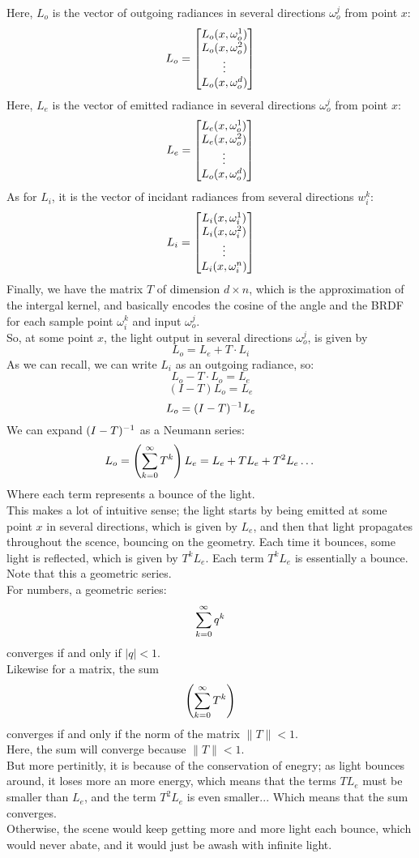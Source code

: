 \documentclass[12pt]{article}
\begin{document}
Here, $L_o$ is the vector of outgoing radiances 
in several directions $\omega_o^j$ from point $x$:
\[ L_o = \begin{bmatrix} L_o(x, \omega_o^1) \\ L_o(x, \omega_o^2) \\
\vdots \\ L_o(x, \omega_o^d) \end{bmatrix} \]
Here, $L_e$ is the vector of emitted radiance 
in several directions $\omega_o^j$ from point $x$:
\[ L_e = \begin{bmatrix} L_e(x, \omega_o^1) \\ L_e(x, \omega_o^2) \\
\vdots \\ L_o(x, \omega_o^d) \end{bmatrix} \]
As for $L_i$, it is the vector of incidant radiances
from several directions $w_i^k$:
\[ L_i = \begin{bmatrix} L_i(x, \omega_i^1) \\ L_i(x, \omega_i^2) \\
\vdots \\ L_i(x, \omega_i^n) \end{bmatrix} \]
Finally, we have the matrix $T$ 
of dimension $d \times n$, which is the approximation
of the intergal kernel,
and basically encodes the cosine of the angle
and the BRDF for each sample point $\omega_i^k$
and input $\omega_o^j$. \\

So, at some point $x$, the light output
in several directions $\omega_o^j$,
is given by 
\[ L_o = L_e + T \cdot L_i \]
As we can recall, we can write $L_i$
as an outgoing radiance, so:
\[ L_o - T \cdot L_o = L_e \]
\[ (I - T)L_o = L_e \]
\[ L_o = (I - T)^{-1} L_e \]
We can expand $(I - T)^{-1}$ as a Neumann series:
\[ L_o = \left( \sum_{k = 0}^{\infty} T^k \right) L_e
= L_e + TL_e + T^2L_e \dots \]
Where each term represents a bounce of the light. \\

This makes a lot of intuitive sense;
the light starts by being emitted at some point
$x$ in several directions, which is given by $L_e$,
and then that light propagates throughout the scence,
bouncing on the geometry. Each time it bounces,
some light is reflected, which is given by $T^k L_e$.
Each term $T^k L_e$ is essentially a bounce. \\
Note that this a geometric series. \\

For numbers, a geometric series:
\[ \sum_{k = 0}^{\infty} q^k \]
converges if and only if $|q| < 1$. \\

Likewise for a matrix, the sum
\[ \left( \sum_{k = 0}^{\infty} T^k \right) \]
converges if and only if the norm of the matrix
$\|T\| < 1$. \\

Here, the sum will converge because $\|T\| < 1$. \\
But more pertinitly, it is because of the conservation
of enegry; as light bounces around,
it loses more an more energy, which
means that the terms $T L_e$ must be smaller than $L_e$,
and the term $T^2 L_e$ is even smaller...
Which means that the sum converges. \\
Otherwise, the scene would keep getting more and more
light each bounce, which would never abate,
and it would just be awash with infinite light. \\

\newpage
\end{document}
